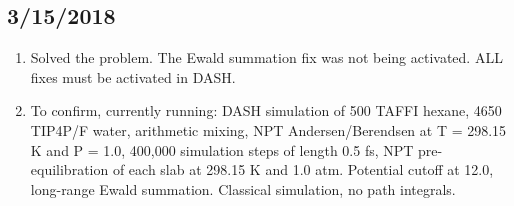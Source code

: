\documentclass[12pt,reqno]{amsart}
\numberwithin{equation}{section}
\begin{document}
\subsection{3/15/2018}
\begin{enumerate}
\item Solved the problem.  The Ewald summation fix was not being activated.  ALL fixes must be activated in DASH.
\item To confirm, currently running: DASH simulation of 500 TAFFI hexane, 4650 TIP4P/F water, arithmetic mixing, NPT Andersen/Berendsen at T = 298.15 K and P = 1.0, 400,000 simulation steps of length 0.5 fs, NPT pre-equilibration of each slab at 298.15 K and 1.0 atm.  Potential cutoff at 12.0, long-range Ewald summation.  Classical simulation, no path integrals.     
\end{enumerate}
\end{document}
